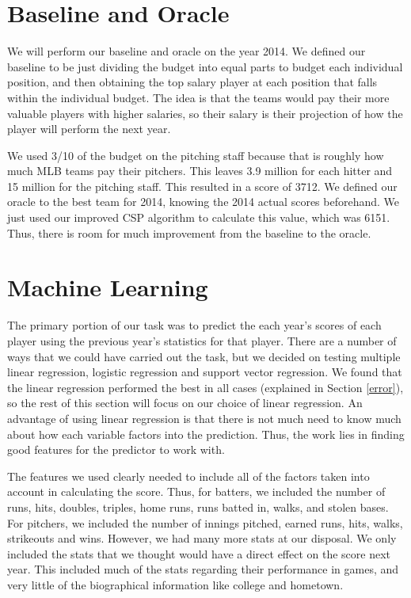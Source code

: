 \documentclass[12pt]{amsart}
\begin{document}
\section{\large Baseline and Oracle}
We will perform our baseline and oracle on the year 2014. We defined our baseline to be just dividing the budget into equal parts to budget each individual position, and then obtaining the top salary player at each position that falls within the individual budget. The idea is that the teams would pay their more valuable players with higher salaries, so their salary is their projection of how the player will perform the next year.
\vspace{.4cm}

We used 3/10 of the budget on the pitching staff because that is roughly how much MLB teams pay their pitchers. This leaves 3.9 million for each hitter and 15 million for the pitching staff. This resulted in a score of 3712. We defined our oracle to the best team for 2014, knowing the 2014 actual scores beforehand. We just used our improved CSP algorithm to calculate this value, which was 6151. Thus, there is room for much improvement from the baseline to the oracle.

\section{\large Machine Learning}
The primary portion of our task was to predict the each year's scores of each player using the previous year's statistics for that player. There are a number of ways that we could have carried out the task, but we decided on testing multiple linear regression, logistic regression and support vector regression. We found that the linear regression performed the best in all cases (explained in Section \ref{error}), so the rest of this section will focus on our choice of linear regression. An advantage of using linear regression is that there is not much need to know much about how each variable factors into the prediction. Thus, the work lies in finding good features for the predictor to work with.
\vspace{.4cm}

The features we used clearly needed to include all of the factors taken into account in calculating the score. Thus, for batters, we included the number of runs, hits, doubles, triples, home runs, runs batted in, walks, and stolen bases. For pitchers, we included the number of innings pitched, earned runs, hits, walks, strikeouts and wins. However, we had many more stats at our disposal. We only included the stats that we thought would have a direct effect on the score next year. This included much of the stats regarding their performance in games, and very little of the biographical information like college and hometown. 
\vspace{.4cm}
\end{document}
